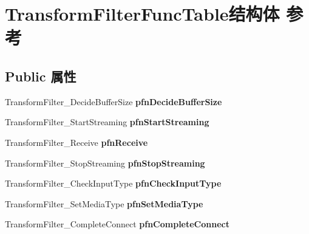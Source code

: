 \hypertarget{struct_transform_filter_func_table}{}\section{Transform\+Filter\+Func\+Table结构体 参考}
\label{struct_transform_filter_func_table}
\subsection*{Public 属性}
\begin{DoxyCompactItemize}
\item 
\mbox{\label{struct_transform_filter_func_table_ac5411c878ebb7bb3daaa7471c79532eb}} 
Transform\+Filter\+\_\+\+Decide\+Buffer\+Size {\bfseries pfn\+Decide\+Buffer\+Size}
\item 
\mbox{\label{struct_transform_filter_func_table_ad0d5eacd5f94d4d3aabf7186969e97e5}} 
Transform\+Filter\+\_\+\+Start\+Streaming {\bfseries pfn\+Start\+Streaming}
\item 
\mbox{\label{struct_transform_filter_func_table_a845aaf525bc8b14660b716457ff657e4}} 
Transform\+Filter\+\_\+\+Receive {\bfseries pfn\+Receive}
\item 
\mbox{\label{struct_transform_filter_func_table_a1178678c3a0a8ffd29a4b1e58078bb9a}} 
Transform\+Filter\+\_\+\+Stop\+Streaming {\bfseries pfn\+Stop\+Streaming}
\item 
\mbox{\label{struct_transform_filter_func_table_a0b818439332dec95704735632d795b03}} 
Transform\+Filter\+\_\+\+Check\+Input\+Type {\bfseries pfn\+Check\+Input\+Type}
\item 
\mbox{\label{struct_transform_filter_func_table_a86bc92f6f7bd4503e68048e1379ad614}} 
Transform\+Filter\+\_\+\+Set\+Media\+Type {\bfseries pfn\+Set\+Media\+Type}
\item 
\mbox{\label{struct_transform_filter_func_table_a05e7a5890233c569099a4531dce7ebcb}} 
Transform\+Filter\+\_\+\+Complete\+Connect {\bfseries pfn\+Complete\+Connect}

\end{DoxyCompactItemize}
